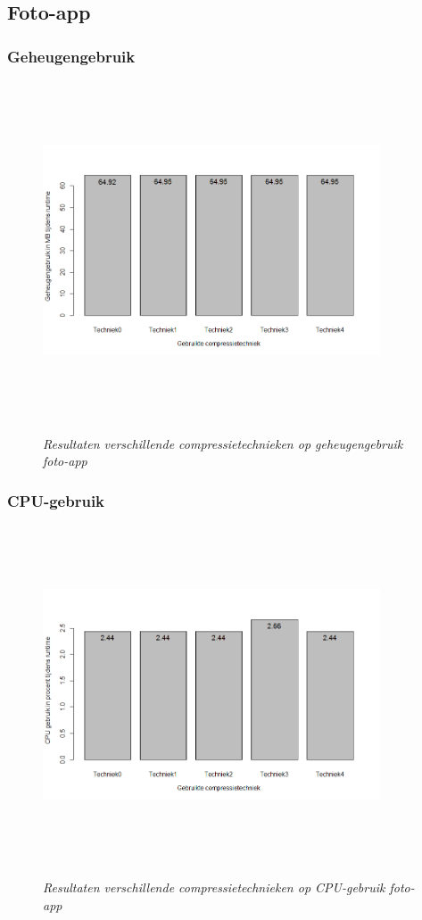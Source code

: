 \subsection{Foto-app}
\subsubsection{Geheugengebruik}
\begin{figure}[H]
	\centering
	\caption{\textit{Resultaten verschillende compressietechnieken op geheugengebruik foto-app}}
	\includegraphics[width=10cm, height=10cm, keepaspectratio]{img/Rplot03}\\[.5cm]
	
\end{figure}
\subsubsection{CPU-gebruik}
\begin{figure}[H]
	\centering
	\caption{\textit{Resultaten verschillende compressietechnieken op CPU-gebruik foto-app}}
	\includegraphics[width=10cm, height=10cm, keepaspectratio]{img/app1cpu}\\[.5cm]
	
\end{figure}
